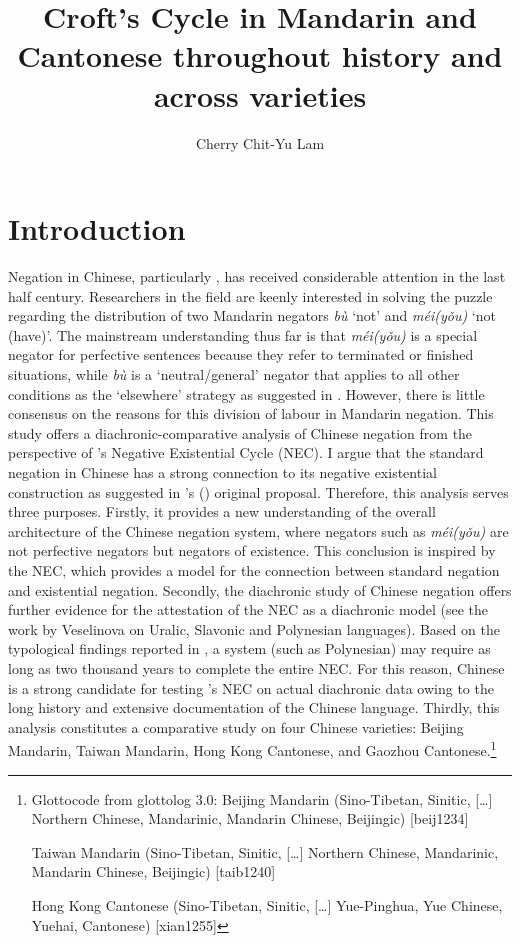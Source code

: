 \documentclass[output=paper,colorlinks,citecolor=brown,chinesefont]{langscibook}
\author{Cherry Chit-Yu Lam \affiliation{Hong Kong Shue Yan University}}
\title{Croft's Cycle in Mandarin and Cantonese throughout history and across varieties}
\begin{document}
\maketitle

\section{Introduction}\label{s:lam1}

Negation in Chinese, particularly , has received considerable attention in the last half century. Researchers in the field are keenly interested in solving the puzzle regarding the distribution of two Mandarin negators \textit{bù} `not' and \textit{méi(yǒu)} `not (have)'. The mainstream understanding thus far is that \textit{méi(yǒu)} is a special negator for perfective sentences because they refer to terminated or  finished situations, while \textit{bù} is a `neutral/general' negator that applies to all other conditions as the `elsewhere' strategy as suggested in \cite{LiThompson1981}. However, there is little consensus on the reasons for this division of labour in Mandarin negation. This study offers a diachronic-comparative analysis of Chinese negation from the perspective of \citeauthor{Croft1991}'s Negative Existential Cycle (NEC). I argue that the standard negation in Chinese has a strong connection to its negative existential construction as suggested in \citeauthor{Croft1991}'s (\citeyear{Croft1991}) original proposal. Therefore, this analysis serves three purposes. Firstly, it provides a new understanding of the overall architecture of the Chinese negation system, where negators such as \textit{méi(yǒu)} are not perfective negators but negators of existence. This conclusion is inspired by the NEC, which provides a model for the connection between standard negation and existential negation. Secondly, the diachronic study of Chinese negation offers further evidence for the attestation of the NEC as a diachronic model (see the work by Veselinova on Uralic, Slavonic and Polynesian languages). Based on the typological findings reported in \cite{Veselinova2014}, a system (such as Polynesian) may require as long as two thousand years to complete the entire NEC. For this reason, Chinese is a strong candidate for testing \citeauthor{Croft1991}'s NEC on actual diachronic data owing to the long history and extensive documentation of the Chinese language. Thirdly, this analysis constitutes a comparative study on four Chinese varieties: Beijing Mandarin, Taiwan Mandarin, Hong Kong Cantonese, and Gaozhou Cantonese.\footnote{Glottocode from glottolog 3.0: Beijing Mandarin (Sino-Tibetan, Sinitic, […] Northern Chinese, Mandarinic, Mandarin Chinese, Beijingic) [beij1234]

Taiwan Mandarin (Sino-Tibetan, Sinitic, […] Northern Chinese, Mandarinic, Mandarin Chinese, Beijingic) [taib1240]

Hong Kong Cantonese (Sino-Tibetan, Sinitic, […] Yue-Pinghua, Yue Chinese, Yuehai, Cantonese) [xian1255]} 
\end{document}
